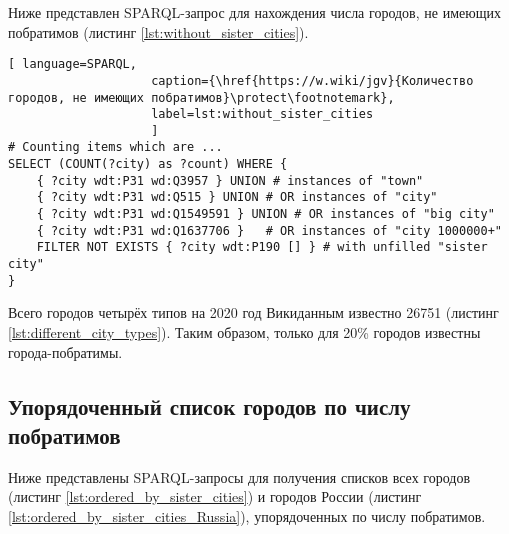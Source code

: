 Ниже представлен SPARQL-запрос для нахождения числа городов, не имеющих побратимов (листинг \ref{lst:without_sister_cities}).


\begin{lstlisting}[ language=SPARQL, 
                    caption={\href{https://w.wiki/jgv}{Количество городов, не имеющих побратимов}\protect\footnotemark},
                    label=lst:without_sister_cities
                    ]
# Counting items which are ... 
SELECT (COUNT(?city) as ?count) WHERE {                             
	{ ?city wdt:P31 wd:Q3957 } UNION # instances of "town"          
	{ ?city wdt:P31 wd:Q515 } UNION # OR instances of "city"                 
	{ ?city wdt:P31 wd:Q1549591 } UNION # OR instances of "big city"                       
	{ ?city wdt:P31 wd:Q1637706 } 	# OR instances of "city 1000000+"              
	FILTER NOT EXISTS { ?city wdt:P190 [] } # with unfilled "sister city"
}
\end{lstlisting}

Всего городов четырёх типов на 2020 год Викиданным известно \num{26751} (листинг \ref{lst:different_city_types}). Таким образом, только для 20\% городов известны города-побратимы.




\newpage
\subsection{Упорядоченный список городов по числу побратимов}

Ниже представлены SPARQL-запросы для получения списков всех городов (листинг \ref{lst:ordered_by_sister_cities}) и городов России (листинг \ref{lst:ordered_by_sister_cities_Russia}), упорядоченных по числу побратимов.


